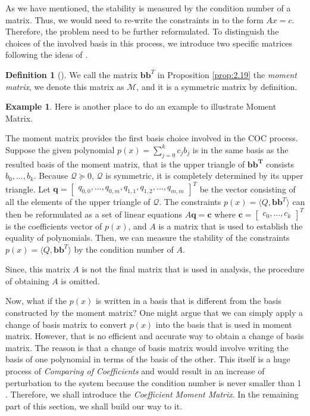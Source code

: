 \documentclass[12pt]{amsart}
\numberwithin{equation}{section}
\theoremstyle{definition}
\newtheorem{definition}[thm]{Definition}
\newtheorem{example}[thm]{Example}
\numberwithin{thm}{section}
\begin{document}
As we have mentioned, the stability is measured by the condition number of a matrix. 
Thus, we would need to re-write the constraints in to the form $A x = c$. 
Therefore, the problem need to be further reformulated. 
To distinguish the choices of the involved basis in this process, we introduce two specific matrices following the ideas of \cite{Recher:Masterthesis}.

\begin{definition}[\cite{Recher:Masterthesis}]
     We call the matrix $\mathbf{bb}^T$ in Proposition \ref{prop:2.19} the \emph{moment matrix}, we denote this matrix as $\mathcal{M}$, and it is a symmetric matrix by definition.
\end{definition}

\begin{example}
     Here is another place to do an example to illustrate Moment Matrix.
\end{example}

\smallskip
The moment matrix provides the first basis choice involved in the COC process. 
Suppose the given polynomial $p(x) = \sum_{j = 0} ^ k c_j b_j$ 
is in the same basis as the resulted basis of the moment matrix, 
that is the upper triangle of $\mathbf{bb^T}$ consists $b_0, ..., b_k$. 
Because $\mathcal{Q} \succcurlyeq 0$, $\mathcal{Q}$ is symmetric, 
it is completely determined by its upper triangle.
Let $\mathbf{q} = \begin{bmatrix} q_{0,0}, ..., q_{0, m}, q_{1,1}, q_{1, 2}, ..., q_{m, m} \end{bmatrix}^T$ 
be the vector consisting of all the elements of the upper triangle of $\mathcal{Q}$.
The constraints $p(x) = \langle Q, \mathbf{bb}^T \rangle$ can then be reformulated as a set of linear equations 
$A \mathbf{q} = \mathbf{c}$ where $ \mathbf{c} = \begin{bmatrix}
     c_0, ..., c_k
\end{bmatrix}^T$ 
is the coefficients vector of $p(x)$, 
and $A$ is a matrix that is used to establish the equality of polynomials. 
Then, we can measure the stability of the constraints $p(x) = \langle Q, \mathbf{bb}^T \rangle$ by the condition number of $A$. 

Since, this matrix $A$ is not the final matrix that is used in analysis, the procedure of obtaining $A$ is omitted. 

\smallskip

Now, what if the $p(x)$ is written in a basis that is different from the basis constructed by the moment matrix?
One might argue that we can simply apply a change of basis matrix to convert $p(x)$ into the basis that is used in moment matrix. 
However, that is no efficient and accurate way to obtain a change of basis matrix. 
The reason is that a change of basis matrix would involve writing the basis of one polynomial in terms of the basis of the other. 
This itself is a huge process of \emph{Comparing of Coefficients} and would result in an increase of perturbation to the system because the condition number is never smaller than 1 \cite{golub1996matrix}.
Therefore, we shall introduce the \emph{Coefficient Moment Matrix}. In the remaining part of this section, we shall build our way to it.
\end{document}

